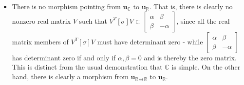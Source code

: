 \documentclass{amsart}
\numberwithin{equation}{section}
\theoremstyle{definition}
\numberwithin{theorem}{section}
\begin{document}
\begin{itemize}
\item  There is no morphism pointing from $\mathbf{u}_{\mathbb{C}}$ to $\mathbf{u}_{\mathbb{R}}$. That is, there is clearly no nonzero real matrix $V$ such that $V^T[\sigma]V \subset \left[\begin{array}{ccc}
 \alpha & \beta   \\ 
 \beta & -\alpha    
\end{array}\right]$, since all the real matrix members of $V^T[\sigma]V$  must have determinant zero - while $\left[\begin{array}{ccc}
 \alpha & \beta   \\ 
 \beta & -\alpha    
\end{array}\right]$ \enlargethispage{1cm}
 has determinant zero if and only if $\alpha,\beta = 0$ and is thereby the zero matrix. This is distinct from the usual demonstration that $\mathbb{C}$ is simple.  On the other hand, there is clearly a morphism from $\mathbf{u}_{\mathbb{R}\oplus\mathbb{R}}$ to $\mathbf{u}_{\mathbb{R}}$.
\end{itemize}
\end{document}

